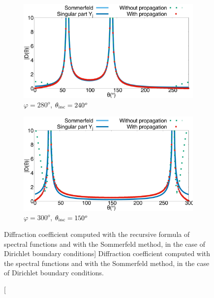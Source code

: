 \begin{figure}[h!]
\begin{subfigure}[b]{0.49\textwidth}
        \includegraphics[width=\textwidth]{images/chapter2/Figure8c.pdf}
        \caption{$\varphi = 280^o$, $\theta_{\rm inc} = 240^o$}
        \label{chapter5:figure12d}
    \end{subfigure}
\begin{subfigure}[b]{0.49\textwidth}
        \includegraphics[width=\textwidth]{images/chapter2/Figure8d.pdf}
        \caption{$\varphi = 300^o$, $\theta_{\rm inc} = 150^o$}
        \label{chapter5:figure12c}
    \end{subfigure}
\caption
[Diffraction coefficient computed with the recursive formula of spectral functions and with the Sommerfeld method, in the case of Dirichlet boundary conditions]
{Diffraction  coefficient computed with the spectral functions and with the Sommerfeld method, in the case of Dirichlet boundary conditions.}
\label{chapter5:figure12}
\end{figure}

